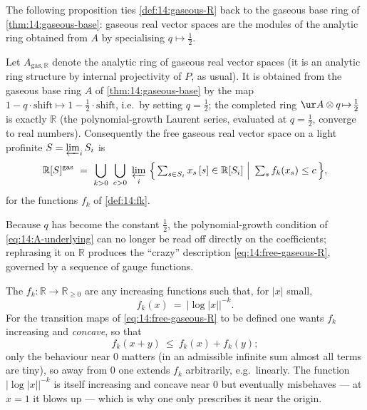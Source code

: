 The following proposition ties \cref{def:14:gaseous-R} back to the gaseous base ring
of \cref{thm:14:gaseous-base}: gaseous real vector spaces are the modules of the
analytic ring obtained from $A$ by specialising $q\mapsto\tfrac12$.

\begin{proposition}
\label{prop:14:specialise}
Let $A_{\mathrm{gas},\mathbb{R}}$ denote the analytic ring of gaseous real vector
spaces (it is an analytic ring structure by internal projectivity of $P$, as
usual). It is obtained from the gaseous base ring $A$ of \cref{thm:14:gaseous-base}
by the map $1-q\cdot\mathrm{shift}\mapsto 1-\tfrac12\cdot\mathrm{shift}$, i.e.\ by
setting $q=\tfrac12$; the completed ring $\ur A\otimes q\!\mapsto\!\tfrac12$ is
exactly $\mathbb{R}$ (the polynomial-growth Laurent series, evaluated at
$q=\tfrac12$, converge to real numbers). Consequently the free gaseous real vector
space on a light profinite $S=\varprojlim_i S_i$ is
\begin{equation}
\label{eq:14:free-gaseous-R}
\mathbb{R}[S]^{\mathrm{gas}}\ =\ \bigcup_{k>0}\ \bigcup_{c>0}\ \varprojlim_i\ \Bigl\{\,\textstyle\sum_{s\in S_i} x_s\,[s]\in\mathbb{R}[S_i]\ \Big|\ \sum_{s} f_k(x_s)\le c\,\Bigr\},
\end{equation}
for the functions $f_k$ of \cref{def:14:fk}.
\end{proposition}

Because $q$ has become the constant $\tfrac12$, the polynomial-growth condition of
\eqref{eq:14:A-underlying} can no longer be read off directly on the coefficients;
rephrasing it on $\mathbb{R}$ produces the ``crazy'' description
\eqref{eq:14:free-gaseous-R}, governed by a sequence of gauge functions.

\begin{definition}
\label{def:14:fk}
The $f_k\colon\mathbb{R}\to\mathbb{R}_{\ge0}$ are any increasing functions such that,
for $|x|$ small,
\begin{equation}
\label{eq:14:fk}
f_k(x)\ =\ \bigl|\log|x|\bigr|^{-k}.
\end{equation}
For the transition maps of \eqref{eq:14:free-gaseous-R} to be defined one wants
$f_k$ increasing and \emph{concave}, so that
\begin{equation*}
f_k(x+y)\ \le\ f_k(x)+f_k(y);
\end{equation*}
only the behaviour near $0$ matters (in an admissible infinite sum almost all terms
are tiny), so away from $0$ one extends $f_k$ arbitrarily, e.g.\ linearly. The
function $|\log|x||^{-k}$ is itself increasing and concave near $0$ but eventually
misbehaves --- at $x=1$ it blows up --- which is why one only prescribes it near the
origin.
\end{definition}

